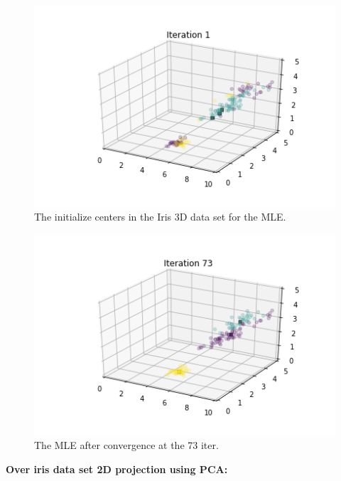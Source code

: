 \documentclass[12pt, a4paper]{paper}
\begin{document}
\begin{figure}[h!]
\centering
\includegraphics[scale=0.5]{MLE_iris_3D_1_iter.png}
\caption{The initialize centers in the Iris 3D data set for the MLE.}
\label{fig:iris_3d_2}
\end{figure}

\begin{figure}[h!]
\centering
\includegraphics[scale=0.5]{MLE_iris_3D_73_iter.png}
\caption{The MLE after convergence at the 73 iter.}
\label{fig:iris_3d_3}
\end{figure}

\newpage
\textbf{Over iris data set 2D projection using PCA:}
\end{document}
